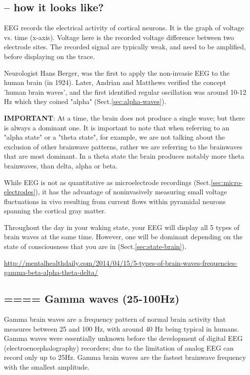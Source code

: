 \subsection{-- how it looks like?}

EEG records the electrical activity of cortical neurons. It is the graph of
voltage vs. time (x-axis). Voltage here is the recorded voltage difference
between two electrode sites. The recorded signal are typically weak, and need to
be amplified, before displaying on the trace.

Neurologist Hans Berger, was the first to apply the non-invasie EEG to the human
brain (in 1924). Later, Andrian and Matthews verified the concept 'human brain
waves', and the first identified regular oscillation was around 10-12 Hz which
they coined "alpha" (Sect.\ref{sec:alpha-waves}).

{\bf IMPORTANT}: At a time, the brain does not produce a single wave; but there
is always a dominant one. It is important to note that when referring to an
"alpha state" or a "theta state", for example, we are not talking about the
exclusion of other brainwave patterns, rather we are referring to the brainwaves
that are most dominant. In a theta state the brain produces notably more theta
brainwaves, than delta, alpha or beta.

\begin{mdframed}

While EEG is not as quantitative as microelectrode recordings
(Sect.\ref{sec:micro-electrodes}), it has the advantage of noninvasively
measuring small voltage fluctuations in vivo resulting from current flows within
pyramidal neurons spanning the cortical gray matter.
\end{mdframed}


Throughout the day in your waking state, your EEG will
display all 5 types of brain waves at the same time. However, one will be
dominant depending on the state of consciousness that you are in
(Sect.\ref{sec:state-brain}).

\url{http://mentalhealthdaily.com/2014/04/15/5-types-of-brain-waves-frequencies-gamma-beta-alpha-theta-delta/}


\subsection{====  Gamma waves (25-100Hz)}
\label{sec:frequencies-gamma}
\label{sec:gamma-wave}

Gamma brain waves are a frequency pattern of normal brain activity that measures
between 25 and 100 Hz, with around 40 Hz being typical in humans.
Gamma waves were essentially unknown before the development of digital EEG
(electroencephalography) recorders; due to the limitation of analog EEG can
record only up to 25Hz. Gamma brain waves are the fastest brainwave frequency
with the smallest amplitude. 

